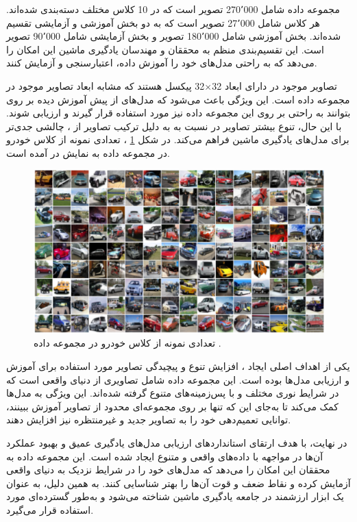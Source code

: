 مجموعه داده
شامل 270٬000 تصویر است که در 10 کلاس مختلف دسته‌بندی شده‌اند. هر کلاس شامل 27٬000 تصویر است که به دو بخش آموزشی و آزمایشی تقسیم شده‌اند. بخش آموزشی شامل 180٬000 تصویر و بخش آزمایشی شامل 90٬000 تصویر است. این تقسیم‌بندی منظم به محققان و مهندسان یادگیری ماشین این امکان را می‌دهد که به راحتی مدل‌های خود را آموزش داده، اعتبارسنجی و آزمایش کنند.

تصاویر موجود در
دارای ابعاد
32$\times$32
پیکسل هستند که مشابه ابعاد تصاویر موجود در مجموعه داده
است. این ویژگی باعث می‌شود که مدل‌های از پیش آموزش دیده بر روی
بتوانند به راحتی بر روی این مجموعه داده نیز مورد استفاده قرار گیرند و ارزیابی شوند. با این حال، تنوع بیشتر تصاویر در
نسبت به
به دلیل ترکیب تصاویر از
،
چالشی جدی‌تر برای مدل‌های یادگیری ماشین فراهم می‌کند.
در شکل
\ref{cinic10}%
، تعدادی نمونه از کلاس خودرو در مجموعه داده
\mbox{}
به نمایش در آمده است.


\begin{figure}[b!]
	\centering
	\includegraphics[scale=0.5]{images/chap5/cinic10.png}%
	\caption{%
		تعدادی نمونه از کلاس خودرو در مجموعه داده
		\cite{darlow2018cinic}.
	}
	\label{cinic10}
	\centering
\end{figure}



یکی از اهداف اصلی ایجاد
،
افزایش تنوع و پیچیدگی تصاویر مورد استفاده برای آموزش و ارزیابی مدل‌ها بوده است. این مجموعه داده شامل تصاویری از دنیای واقعی است که در شرایط نوری مختلف و با پس‌زمینه‌های متنوع گرفته شده‌اند. این ویژگی به مدل‌ها کمک می‌کند تا به‌جای این که تنها بر روی مجموعه‌ای محدود از تصاویر آموزش ببینند، توانایی تعمیم‌دهی خود را به تصاویر جدید و غیرمنتظره نیز افزایش دهند.

در نهایت،
با هدف ارتقای استانداردهای ارزیابی مدل‌های یادگیری عمیق و بهبود عملکرد آن‌ها در مواجهه با داده‌های واقعی و متنوع ایجاد شده است. این مجموعه داده به محققان این امکان را می‌دهد که مدل‌های خود را در شرایط نزدیک به دنیای واقعی آزمایش کرده و نقاط ضعف و قوت آن‌ها را بهتر شناسایی کنند. به همین دلیل،
به عنوان یک ابزار ارزشمند در جامعه یادگیری ماشین شناخته می‌شود و به‌طور گسترده‌ای مورد استفاده قرار می‌گیرد.


